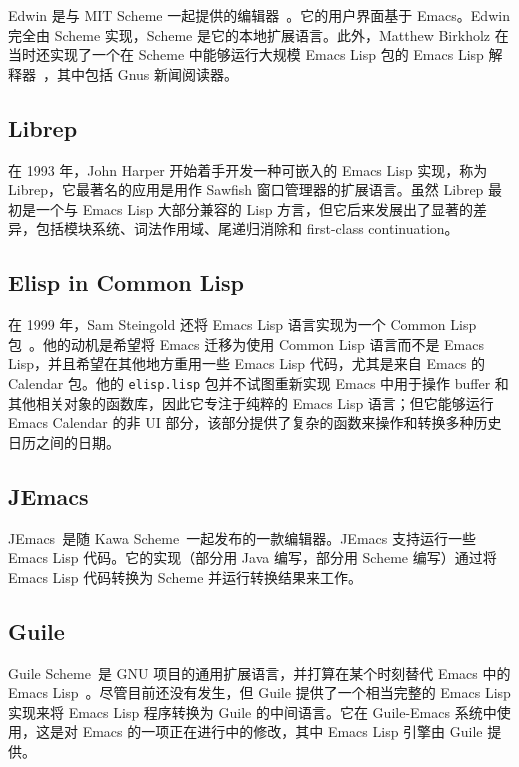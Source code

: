 \documentclass[format=acmsmall,screen]{acmart}
\begin{document}
Edwin 是与 MIT Scheme 一起提供的编辑器~\cite{MITScheme2014}。它的用户界面基于 Emacs。Edwin 完全由 Scheme 实现，Scheme 是它的本地扩展语言。此外，Matthew Birkholz 在当时还实现了一个在 Scheme 中能够运行大规模 Emacs Lisp 包的 Emacs Lisp 解释器~\cite{Birkholz1993}，其中包括 Gnus 新闻阅读器。

\subsection{Librep}

在 1993 年，John Harper 开始着手开发一种可嵌入的 Emacs Lisp 实现，称为 Librep，它最著名的应用是用作 Sawfish 窗口管理器的扩展语言。虽然 Librep 最初是一个与 Emacs Lisp 大部分兼容的 Lisp 方言，但它后来发展出了显著的差异，包括模块系统、词法作用域、尾递归消除和 first-class continuation。

\subsection{Elisp in Common Lisp}

在 1999 年，Sam Steingold 还将 Emacs Lisp 语言实现为一个 Common Lisp 包~\cite{Steingold99}。他的动机是希望将 Emacs 迁移为使用 Common Lisp 语言而不是 Emacs Lisp，并且希望在其他地方重用一些 Emacs Lisp 代码，尤其是来自 Emacs 的 Calendar 包。他的 \texttt{elisp.lisp} 包并不试图重新实现 Emacs 中用于操作 buffer 和其他相关对象的函数库，因此它专注于纯粹的 Emacs Lisp 语言；但它能够运行 Emacs Calendar 的非 UI 部分，该部分提供了复杂的函数来操作和转换多种历史日历之间的日期。

\subsection{JEmacs}

JEmacs~\cite{Bothner2001}是随 Kawa Scheme~\cite{KawaScheme}一起发布的一款编辑器。JEmacs 支持运行一些 Emacs Lisp 代码。它的实现（部分用 Java 编写，部分用 Scheme 编写）通过将 Emacs Lisp 代码转换为 Scheme 并运行转换结果来工作。

\subsection{Guile}

Guile Scheme~\cite{Guile2020}是 GNU 项目的通用扩展语言，并打算在某个时刻替代 Emacs 中的 Emacs Lisp~\cite{WhyNotTcl}。尽管目前还没有发生，但 Guile 提供了一个相当完整的 Emacs Lisp 实现来将 Emacs Lisp 程序转换为 Guile 的中间语言。它在 Guile-Emacs 系统中使用，这是对 Emacs 的一项正在进行中的修改，其中 Emacs Lisp 引擎由 Guile 提供。
\end{document}
